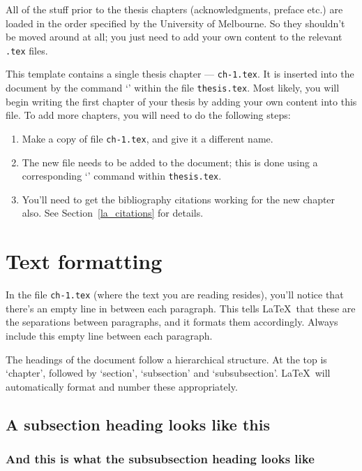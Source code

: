 All of the stuff prior to the thesis chapters (acknowledgments, preface etc.) are loaded in the order specified by the University of Melbourne. So they shouldn't be moved around at all; you just need to add your own content to the relevant \verb+.tex+ files.

This template contains a single thesis chapter --- \verb+ch-1.tex+. It is inserted into the document by the command `\verb++' within the file \verb+thesis.tex+. Most likely, you will begin writing the first chapter of your thesis by adding your own content into this file. To add more chapters, you will need to do the following steps:

\begin{enumerate}

\item Make a copy of file \verb+ch-1.tex+, and give it a different name.

\item The new file needs to be added to the document; this is done using a corresponding `\verb++' command within \verb+thesis.tex+.

\item You'll need to get the bibliography citations working for the new chapter also. See Section~\ref{la_citations} for details.

\end{enumerate}
%
%
\section{Text formatting}

In the file \verb+ch-1.tex+ (where the text you are reading resides), you'll notice that there's an empty line in between each paragraph. This tells \LaTeX~that these are the separations between paragraphs, and it formats them accordingly. Always include this empty line between each paragraph.

The headings of the document follow a hierarchical structure. At the top is `chapter', followed by `section', `subsection' and `subsubsection'. \LaTeX~will automatically format and number these appropriately.

\subsection{A subsection heading looks like this}

\subsubsection{And this is what the subsubsection heading looks like}

